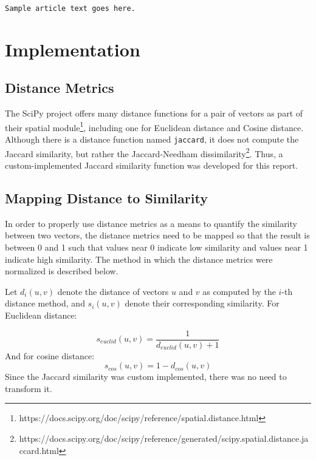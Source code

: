 \documentclass[11pt]{article}
\begin{document}
\begin{verbatim}
Sample article text goes here.
\end{verbatim}

\section{Implementation}

\subsection{Distance Metrics}

The SciPy project offers many distance functions for a pair of vectors as part of their spatial module\footnote{
https://docs.scipy.org/doc/scipy/reference/spatial.distance.html
}, including one for Euclidean distance %
and Cosine distance. %
Although there is a distance function named \texttt{jaccard}, it does not compute the Jaccard similarity, but rather the Jaccard-Needham dissimilarity\footnote{
https://docs.scipy.org/doc/scipy/reference/generated/scipy.spatial.distance.jaccard.html
}.
Thus, a custom-implemented Jaccard similarity function was developed for this report.


\subsection{Mapping Distance to Similarity}

In order to properly use distance metrics as a means to quantify the similarity between two vectors, the distance metrics need to be mapped so that the result is between 0 and 1 such that values near 0 indicate low similarity and values near 1 indicate high similarity. The method in which the distance metrics were normalized is described below.

Let $d_i(u, v)$ denote the distance of vectors $u$ and $v$ as computed by the $i$-th distance method, and $s_i(u, v)$ denote their corresponding similarity.
For Euclidean distance:

\begin{equation} \label{eq:euclid}
s_{euclid}(u, v) = \frac{1}{d_{euclid}(u, v) + 1}
\end{equation}
And for cosine distance:
\begin{equation} \label{eq:cosine}
s_{cos}(u, v) = 1 - d_{cos}(u, v)
\end{equation}
Since the Jaccard similarity was custom implemented, there was no need to transform it.
\end{document}
